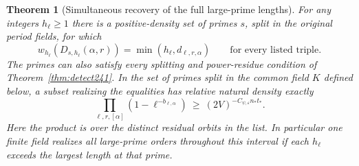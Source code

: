\documentclass[a4paper,11pt]{article}
\newtheorem{theorem}[proposition]{Theorem}
\theoremstyle{definition}
\theoremstyle{remark}
\numberwithin{equation}{section}
\begin{document}
\begin{theorem}[Simultaneous recovery of the full large-prime lengths]\leavevmode
\label{thm:commonlength267}
For any integers \(h_\ell\ge1\) there is a positive-density set
of primes \(s\), split in the original period fields, for which
\[
 w_{h_\ell}(D_{s,h_\ell}(\alpha,r))
       =\min(h_\ell,d_{\ell,r,\alpha})
       \qquad\text{for every listed triple.}
\]
The primes can also satisfy every splitting and power-residue
condition of Theorem~\ref{thm:detect241}. In the set of primes
split in the common field \(K\) defined below, a subset realizing
the equalities has relative natural density exactly
\[
 \prod_{\ell,r,[\alpha]}(1-\ell^{-b_{\ell,\alpha}})
       \ \ge\ (2V)^{-C_{\psi,\varepsilon} n_*t_*}.
\]
Here the product is over the distinct residual orbits in the
list. In particular one finite field realizes \emph{all}
large-prime orders throughout this interval if each \(h_\ell\)
exceeds the largest length at that prime.
\end{theorem}
\end{document}
